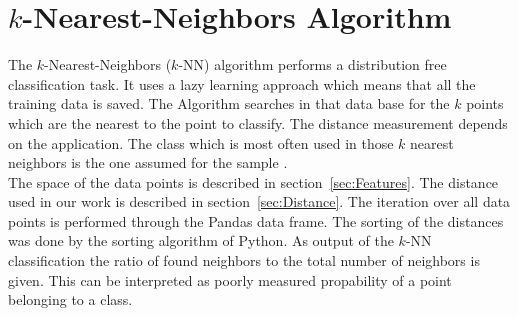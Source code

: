 \section{$k$-Nearest-Neighbors Algorithm}
\label{sec:TheoryKnn}
The $k$-Nearest-Neighbors ($k$-NN) algorithm performs a distribution free classification task. It uses a lazy learning approach which means that all the training data is saved. The Algorithm searches in that data base for the $k$ points which are the nearest to the point to classify. The distance measurement depends on the application. The class which is most often used in those $k$ nearest neighbors is the one assumed for the sample \cite[p.~338~f.]{bib:Alzate2007}.\\
The space of the data points is described in section~\ref{sec:Features}. The distance used in our work is described in section~\ref{sec:Distance}. The iteration over all data points is performed through the Pandas data frame. The sorting of the distances was done by the sorting algorithm of Python. As output of the $k$-NN classification the ratio of found neighbors to the total number of neighbors is given. This can be interpreted as poorly measured propability of a point belonging to a class.
